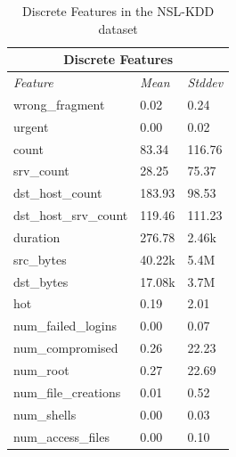 \begin{table}[]
    \centering
     \begin{tabular}{|l|l|l|}
    \hline
    \multicolumn{3}{|c|}{\textbf{Discrete Features}} \\ \hline
    \textit{Feature}     & \textit{Mean} & \textit{Stddev} \\ \hline
    wrong\_fragment   & 0.02      & 0.24  \\ \hline
    urgent   & 0.00      & 0.02  \\ \hline
    count    & 83.34     & 116.76    \\ \hline
    srv\_count    & 28.25     & 75.37     \\ \hline
    dst\_host\_count   & 183.93    & 98.53     \\ \hline
    dst\_host\_srv\_count   & 119.46    & 111.23    \\ \hline
    duration     & 276.78    & 2.46k   \\ \hline
    src\_bytes    & 40.22k      & 5.4M    \\ \hline
    dst\_bytes    & 17.08k     & 3.7M    \\ \hline
    hot  & 0.19      & 2.01  \\ \hline
    num\_failed\_logins    & 0.00      & 0.07  \\ \hline
    num\_compromised  & 0.26      & 22.23     \\ \hline
    num\_root     & 0.27      & 22.69     \\ \hline
    num\_file\_creations   & 0.01      & 0.52  \\ \hline
    num\_shells   & 0.00      & 0.03  \\ \hline
    num\_access\_files     & 0.00      & 0.10  \\ \hline
    \end{tabular}
    \caption{Discrete Features in the NSL-KDD dataset}
    \label{tab:disc}
\end{table}

